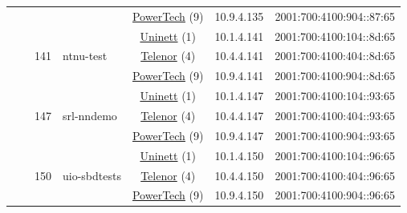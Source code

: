 \begin{small}
\begin{center}
\begin{longtable}{|c|c|c|c|c|c|c|c|}
  &  &  &  & \multicolumn{2}{|c|}{\tiny{\href{http://www.powertech.no}{PowerTech} (9)}} & \tiny{10.9.4.135} & \tiny{2001:700:4100:904::87:65} \\* \cline{3-3}\cline{4-4}\cline{5-5}\cline{6-6}\cline{7-7}\cline{8-8}
  &  & \multirow{3}{*}{\tiny{141}} & \multicolumn{1}{|l|}{\multirow{3}{*}{\tiny{ntnu-test}}} & \multicolumn{2}{|c|}{\tiny{\href{https://www.uninett.no}{Uninett} (1)}} & \tiny{10.1.4.141} & \tiny{2001:700:4100:104::8d:65} \\* \cline{5-5}\cline{6-6}\cline{7-7}\cline{8-8}
  &  &  &  & \multicolumn{2}{|c|}{\tiny{\href{https://www.telenor.no}{Telenor} (4)}} & \tiny{10.4.4.141} & \tiny{2001:700:4100:404::8d:65} \\* \cline{5-5}\cline{6-6}\cline{7-7}\cline{8-8}
  &  &  &  & \multicolumn{2}{|c|}{\tiny{\href{http://www.powertech.no}{PowerTech} (9)}} & \tiny{10.9.4.141} & \tiny{2001:700:4100:904::8d:65} \\* \cline{3-3}\cline{4-4}\cline{5-5}\cline{6-6}\cline{7-7}\cline{8-8}
  &  & \multirow{3}{*}{\tiny{147}} & \multicolumn{1}{|l|}{\multirow{3}{*}{\tiny{srl-nndemo}}} & \multicolumn{2}{|c|}{\tiny{\href{https://www.uninett.no}{Uninett} (1)}} & \tiny{10.1.4.147} & \tiny{2001:700:4100:104::93:65} \\* \cline{5-5}\cline{6-6}\cline{7-7}\cline{8-8}
  &  &  &  & \multicolumn{2}{|c|}{\tiny{\href{https://www.telenor.no}{Telenor} (4)}} & \tiny{10.4.4.147} & \tiny{2001:700:4100:404::93:65} \\* \cline{5-5}\cline{6-6}\cline{7-7}\cline{8-8}
  &  &  &  & \multicolumn{2}{|c|}{\tiny{\href{http://www.powertech.no}{PowerTech} (9)}} & \tiny{10.9.4.147} & \tiny{2001:700:4100:904::93:65} \\* \cline{3-3}\cline{4-4}\cline{5-5}\cline{6-6}\cline{7-7}\cline{8-8}
  &  & \multirow{3}{*}{\tiny{150}} & \multicolumn{1}{|l|}{\multirow{3}{*}{\tiny{uio-sbdtests}}} & \multicolumn{2}{|c|}{\tiny{\href{https://www.uninett.no}{Uninett} (1)}} & \tiny{10.1.4.150} & \tiny{2001:700:4100:104::96:65} \\* \cline{5-5}\cline{6-6}\cline{7-7}\cline{8-8}
  &  &  &  & \multicolumn{2}{|c|}{\tiny{\href{https://www.telenor.no}{Telenor} (4)}} & \tiny{10.4.4.150} & \tiny{2001:700:4100:404::96:65} \\* \cline{5-5}\cline{6-6}\cline{7-7}\cline{8-8}
  &  &  &  & \multicolumn{2}{|c|}{\tiny{\href{http://www.powertech.no}{PowerTech} (9)}} & \tiny{10.9.4.150} & \tiny{2001:700:4100:904::96:65} \\* \cline{3-3}\cline{4-4}\cline{5-5}\cline{6-6}\cline{7-7}\cline{8-8}

\end{longtable}
\end{center}
\end{small}
